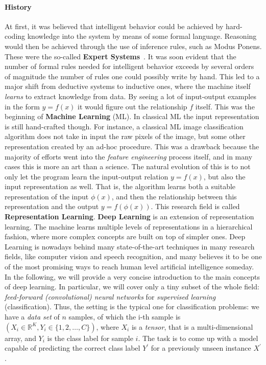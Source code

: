 \documentclass[../main.tex]{subfiles}
\begin{document}
    \paragraph{History}
    At first, it was believed that intelligent behavior could be achieved by hard-coding knowledge into the system by means
    of some formal language. Reasoning would then be achieved through the use of inference rules, such as Modus Ponens.
    These were the so-called \textbf{Expert Systems}~\cite{Jackson_1986}.
    It was soon evident that the number of formal rules needed for intelligent behavior exceeds by several orders of magnitude
    the number of rules one could possibly write by hand.
    \newline
    This led to a major shift from deductive systems to inductive ones, where the machine itself \textit{learns} to extract
    knowledge from data. By seeing a lot of input-output examples in the form $y = f(x)$ it would figure out the relationship $f$ itself.
    This was the beginning of \textbf{Machine Learning} (ML). In classical ML the input representation is still hand-crafted though.
    For instance, a classical ML image classification algorithm does not take in input the raw pixels of the image, but some other
    representation created by an ad-hoc procedure. This was a drawback because the majority of efforts went into the
    \textit{feature engineering} process itself, and in many cases this is more an art than a science.
    \newline
    The natural evolution of this is to not only let the program learn the input-output relation $y = f(x)$,
    but also the input representation as well. That is, the algorithm learns both a suitable representation of the input $\phi(x)$, and then
    the relationship between this representation and the output $y = f(\phi(x))$. This research field is called \textbf{Representation Learning}.
    \newline
    \textbf{Deep Learning} is an extension of representation learning. The machine learns multiple levels of representations
    in a hierarchical fashion, where more complex concepts are built on top of simpler ones.
    Deep Learning is nowadays behind many state-of-the-art techniques in many research fields, like computer vision and speech recognition,
    and many believes it to be one of the most promising ways to reach human level artificial intelligence someday.
    \newline
    In the following, we will provide a very concise introduction to the main concepts of deep learning. In particular, we will cover only a
    tiny subset of the whole field: \textit{feed-forward (convolutional) neural networks} for \textit{supervised learning} (classification).
	Thus, the setting is the typical one for classification problems: we have a \textit{data set} of $n$ samples, of which the i-th sample
	is $(X_{i} \in \mathbb{R}^{K}, Y_{i} \in \{1, 2, \ldots, C\})$, where $X_{i}$ is a \textit{tensor}, that is a multi-dimensional array, and $Y_{i}$
	is the class label for sample $i$. The task is to come up with a model capable of predicting the correct class label $Y^{'}$ for a previously
	unseen instance $X^{'}$.
\end{document}
